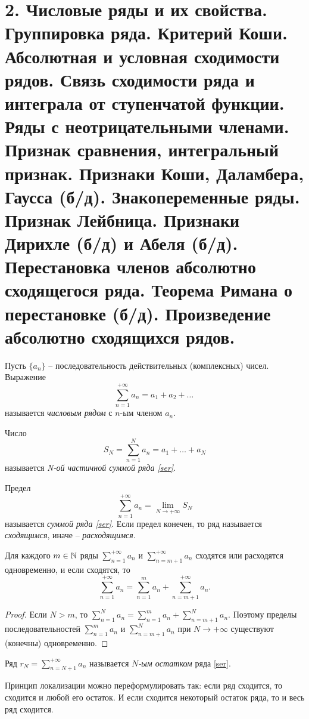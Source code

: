 \section{2. Числовые ряды и их свойства. Группировка ряда. Критерий Коши. Абсолютная и условная сходимости рядов. Связь сходимости ряда и интеграла от ступенчатой функции. Ряды с неотрицательными членами. Признак сравнения, интегральный признак. Признаки Коши, Даламбера, Гаусса (б/д). Знакопеременные ряды. Признак Лейбница. Признаки Дирихле (б/д) и Абеля (б/д). Перестановка членов абсолютно сходящегося ряда. Теорема Римана о перестановке (б/д). Произведение абсолютно сходящихся рядов.}

\begin{definition}
    Пусть $\{a_{n}\}$ -- последовательность действительных (комплексных) чисел. Выражение
    \[\sum_{n = 1}^{+\infty}a_{n} = a_1 + a_2 + \ldots \ \label{ser}\]
    называется \textit{числовым рядом} с $n$-ым членом $a_{n}$.
    
    Число 
    \[S_{N} = \sum_{n = 1}^{N} a_{n} = a_1 + \ldots + a_{N}\]
    называется \textit{N-ой частичной суммой ряда \ref{ser}}.
    
    Предел
    \[\sum_{n = 1}^{+\infty} a_{n} = \lim_{N \to +\infty} S_{N}\]
    называется \textit{суммой ряда \ref{ser}}. Если предел конечен, то ряд называется \textit{сходящимся}, иначе -- \textit{расходящимся}.
\end{definition}

\begin{lemma}
    Для каждого $m \in \mathbb{N}$ ряды $\sum_{n = 1}^{+\infty}a_{n}$ и $\sum_{n = m + 1}^{+\infty}a_{n}$ сходятся или расходятся одновременно, и если сходятся, то
    \[\sum_{n = 1}^{+\infty}a_{n} = \sum_{n = 1}^{m}a_{n} + \sum_{n = m + 1}^{+\infty}a_{n}.\]
\end{lemma}

\begin{proof}
    Если $N > m$, то $\sum_{n = 1}^{N}a_{n} = \sum_{n = 1}^{m}a_{n} + \sum_{n = m + 1}^{N}a_{n}$. Поэтому пределы последовательностей $\sum_{n = 1}^{m}a_{n}$ и $\sum_{n = m + 1}^{N}a_{n}$ при $N \to +\infty$ существуют (конечны) одновременно.
\end{proof}

\begin{note}
    Ряд $r_{N} = \sum_{n = N + 1}^{+\infty} a_{n}$ называется \textit{$N$-ым остатком} ряда \ref{ser}.
\end{note}

Принцип локализации можно переформулировать так: если ряд сходится, то сходится и любой его остаток. И если сходится некоторый остаток ряда, то и весь ряд сходится.


